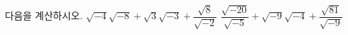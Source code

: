 다음을 계산하시오.
 $\sqrt{-4}\sqrt{-8}+\sqrt{3}\sqrt{-3}+\dfrac{\sqrt{8}}{\sqrt{-2}}$
 $\dfrac{\sqrt{-20}}{\sqrt{-5}}+\sqrt{-9}\sqrt{-4}+\dfrac{\sqrt{81}}{\sqrt{-9}}$
